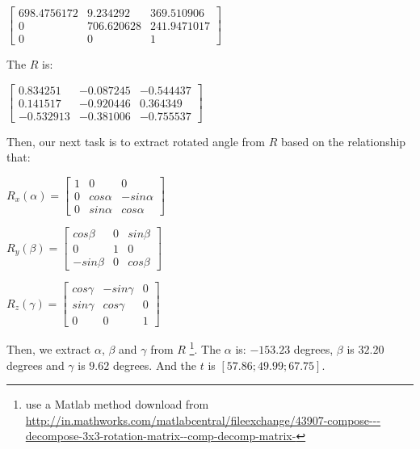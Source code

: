 \documentclass[12pt]{article}
\begin{document}
\begin{center}
$\begin{bmatrix} 	
	698.4756172   & 9.234292    & 369.510906 \\  
	     0     & 706.620628   & 241.9471017 \\  
		 0     & 	 0 	    & 1     
\end{bmatrix}$
\end{center}

The $R$ is:

\begin{center}
$\begin{bmatrix} 	
	0.834251 & -0.087245 & -0.544437 \\  
	0.141517 & -0.920446 &  0.364349 \\  
   -0.532913 & -0.381006 & -0.755537
\end{bmatrix}$
\end{center}

Then, our next task is to extract rotated angle from $R$ based on the relationship that:

\begin{center}
$R_{x}(\alpha) = \begin{bmatrix} 1 & 0 & 0 \\  0 & cos\alpha & -sin\alpha \\  0 & sin\alpha & cos\alpha \end{bmatrix}$
\end{center}

\begin{center}
$R_{y}(\beta) = \begin{bmatrix} cos\beta & 0 & sin\beta \\  0 & 1 & 0 \\  -sin\beta & 0 & cos\beta \end{bmatrix}$
\end{center}

\begin{center}
$R_{z}(\gamma) = \begin{bmatrix} cos\gamma & -sin\gamma & 0 \\  sin\gamma & cos\gamma & 0 \\  0 & 0 & 1 \end{bmatrix}$
\end{center}

Then, we extract $\alpha$, $\beta$ and $\gamma$ from $R$ \footnote{use a Matlab method download from \url{http://in.mathworks.com/matlabcentral/fileexchange/43907-compose---decompose-3x3-rotation-matrix--comp-decomp-matrix-}}. The $\alpha$ is: $-153.23$ degrees, $\beta$ is $32.20$ degrees and $\gamma$ is $9.62$ degrees. And the $t$ is $[57.86; 49.99; 67.75]$.
\end{document}
